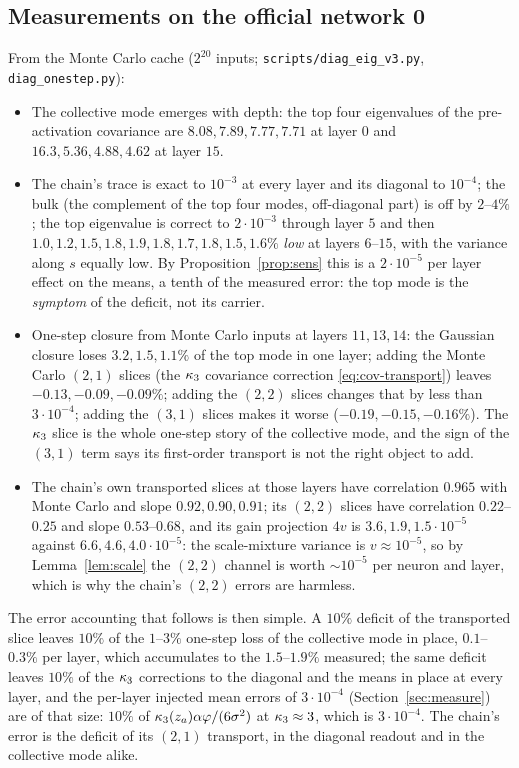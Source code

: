 \subsection{Measurements on the official network 0}
From the Monte Carlo cache ($2^{20}$ inputs; \texttt{scripts/diag\_eig\_v3.py}, \texttt{diag\_onestep.py}):
\begin{itemize}[nosep]
\item The collective mode emerges with depth: the top four eigenvalues of the pre-activation covariance are
$8.08,7.89,7.77,7.71$ at layer $0$ and $16.3,5.36,4.88,4.62$ at layer $15$.
\item The chain's trace is exact to $10^{-3}$ at every layer and its diagonal to $10^{-4}$; the bulk (the
complement of the top four modes, off-diagonal part) is off by $2$--$4\%$; the top eigenvalue is correct to
$2\cdot10^{-3}$ through layer $5$ and then $1.0,1.2,1.5,1.8,1.9,1.8,1.7,1.8,1.5,1.6\%$ \emph{low} at layers
$6$--$15$, with the variance along $s$ equally low. By Proposition~\ref{prop:sens} this is a $2\cdot10^{-5}$ per
layer effect on the means, a tenth of the measured error: the top mode is the \emph{symptom} of the deficit, not
its carrier.
\item One-step closure from Monte Carlo inputs at layers $11,13,14$: the Gaussian closure loses $3.2,1.5,1.1\%$ of the
top mode in one layer; adding the Monte Carlo $(2,1)$ slices (the $\kappa_3$ covariance correction
\eqref{eq:cov-transport}) leaves $-0.13,-0.09,-0.09\%$; adding the $(2,2)$ slices changes that by less than
$3\cdot10^{-4}$; adding the $(3,1)$ slices makes it worse ($-0.19,-0.15,-0.16\%$). The $\kappa_3$ slice is the whole
one-step story of the collective mode, and the sign of the $(3,1)$ term says its first-order transport is not the
right object to add.
\item The chain's own transported slices at those layers have correlation $0.965$ with Monte Carlo and slope
$0.92,0.90,0.91$; its $(2,2)$ slices have correlation $0.22$--$0.25$ and slope $0.53$--$0.68$, and its gain
projection $4v$ is $3.6,1.9,1.5\cdot10^{-5}$ against $6.6,4.6,4.0\cdot10^{-5}$: the scale-mixture variance is $v\approx
10^{-5}$, so by Lemma~\ref{lem:scale} the $(2,2)$ channel is worth $\sim10^{-5}$ per neuron and layer, which is
why the chain's $(2,2)$ errors are harmless.
\end{itemize}
The error accounting that follows is then simple. A $10\%$ deficit of the transported slice leaves $10\%$ of the
$1$--$3\%$ one-step loss of the collective mode in place, $0.1$--$0.3\%$ per layer, which accumulates to the
$1.5$--$1.9\%$ measured; the same deficit leaves $10\%$ of the $\kappa_3$ corrections to the diagonal and the means in
place at every layer, and the per-layer injected mean errors of $3\cdot10^{-4}$ (Section~\ref{sec:measure}) are of
that size: $10\%$ of $\kappa_3(z_a)\alpha\varphi/(6\sigma^2)$ at $\kappa_3\approx3$, which is $3\cdot10^{-4}$. The chain's
error is the deficit of its $(2,1)$ transport, in the diagonal readout and in the collective mode alike.
